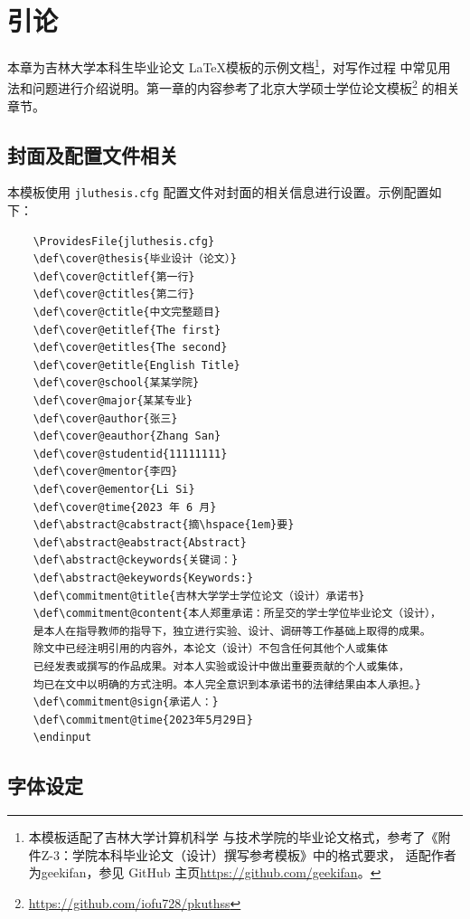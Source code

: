 \chapter{引论}
\label{chap:introduction}

本章为吉林大学本科生毕业论文 \LaTeX 模板的示例文档\footnote{本模板适配了吉林大学计算机科学
与技术学院的毕业论文格式，参考了《附件Z-3：学院本科毕业论文（设计）撰写参考模板》中的格式要求，
适配作者为geekifan，参见 GitHub 主页\url{https://github.com/geekifan}。}，对写作过程
中常见用法和问题进行介绍说明。第一章的内容参考了北京大学硕士学位论文模板\footnote{\url{https://github.com/iofu728/pkuthss}}
的相关章节。

\section{封面及配置文件相关}
\label{sec:cover-pkuthssinfo}

本模板使用 \verb|jluthesis.cfg| 配置文件对封面的相关信息进行设置。示例配置如下：

\begin{Verbatim}
    \ProvidesFile{jluthesis.cfg}
    \def\cover@thesis{毕业设计（论文）}
    \def\cover@ctitlef{第一行}
    \def\cover@ctitles{第二行}
    \def\cover@ctitle{中文完整题目}
    \def\cover@etitlef{The first}
    \def\cover@etitles{The second}
    \def\cover@etitle{English Title}
    \def\cover@school{某某学院}
    \def\cover@major{某某专业}
    \def\cover@author{张三}
    \def\cover@eauthor{Zhang San}
    \def\cover@studentid{11111111}
    \def\cover@mentor{李四}
    \def\cover@ementor{Li Si}
    \def\cover@time{2023 年 6 月}
    \def\abstract@cabstract{摘\hspace{1em}要}
    \def\abstract@eabstract{Abstract}
    \def\abstract@ckeywords{关键词：}
    \def\abstract@ekeywords{Keywords:}
    \def\commitment@title{吉林大学学士学位论文（设计）承诺书}
    \def\commitment@content{本人郑重承诺：所呈交的学士学位毕业论文（设计），
    是本人在指导教师的指导下，独立进行实验、设计、调研等工作基础上取得的成果。
    除文中已经注明引用的内容外，本论文（设计）不包含任何其他个人或集体
    已经发表或撰写的作品成果。对本人实验或设计中做出重要贡献的个人或集体，
    均已在文中以明确的方式注明。本人完全意识到本承诺书的法律结果由本人承担。}
    \def\commitment@sign{承诺人：}
    \def\commitment@time{2023年5月29日}
    \endinput
\end{Verbatim}


\section{字体设定}
\label{sec:fontset}

